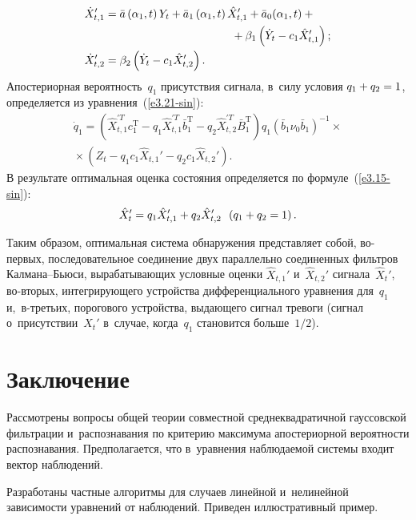 \begin{multicols}{2}
\noindent
  \begin{align*}
    \dot X_{t,1}' &= \bar a \left(\alpha_1,t\right) Y_t + \bar a_1 \left(\alpha_1, t\right) \hat X_{t,1}' +
    \bar a_0 (\alpha_1,t) +{}\\
&   \hspace*{40mm}{}+
    \beta_1 \left(\dot Y_t- c_1 \hat X_{t,1}'\right);
 \\
    \dot X_{t,2}' &=\beta_2 \left(\dot Y_t - c_1 \hat X_{t,2}'\right). %
\end{align*}
Апостериорная вероятность~$q_1$ присутствия сигнала, в~силу условия $q_1 \hm+q_2 \hm=1$, 
определяется из уравнения~(\ref{e3.21-sin}):
 \begin{multline*}
    \dot q_1 =(\hat X_{t,1}^{'T} c_1^{\mathrm{T}} - q_1 \hat X_{t,1}^{'T} \bar b_1^{\mathrm{T}} - q_2 \hat X_{t,2}^{'T} \bar B_1^{\mathrm{T}}) 
    q_1 \left(\bar b_1 \nu_0 \bar b_1\right)^{-1}\times{}\\
    {}\times \left(Z_t - q_1 c_1 \hat X_{t,1}' - q_2 c_1 \hat X_{t,2}'\right).
\end{multline*}
В результате оптимальная оценка состояния определяется по формуле~(\ref{e3.15-sin}):
    $$
    \hat X_{t}' = q_1 \hat X_{t,1}' + q_2 \hat X_{t,2}'\enskip \left(q_1 + q_2 =1\right).
    $$

Таким образом, оптимальная система обнаружения представляет собой, 
во-пер\-вых, последовательное соединение двух параллельно соединенных фильтров Кал\-ма\-на--Бью\-си, 
вырабатывающих условные оценки $\hat X_{t,1}'$ и~$\hat X_{t,2}'$ сигнала~$\hat X_{t}'$, во-вто\-рых, 
интегрирующего устройства дифференциального уравнения для~$q_1$ и,~в-треть\-их, 
порогового устройства, выдающего сигнал тревоги (сигнал о~присутствии~$X_t'$ в~случае, когда~$q_1$ 
становится больше~$1/2$).


\section{Заключение}

Рассмотрены вопросы общей теории совместной среднеквадратичной гауссовской фильтрации и~распознавания
 по критерию максимума апостериорной вероятности распознавания. Предполагается, что в~уравнения 
 наблюдаемой системы входит вектор наблюдений.

Разработаны частные алгоритмы для случаев линейной и~нелинейной зависимости уравнений 
от наблюдений. Приведен иллюстративный пример.


\end{multicols}
